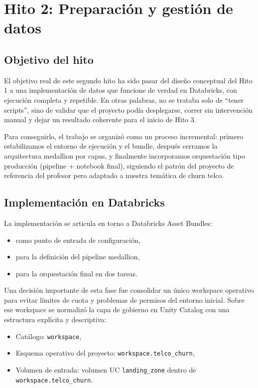 \documentclass[12pt,a4paper]{article}
\begin{document}
\section{Hito 2: Preparación y gestión de datos}

\subsection{Objetivo del hito}

El objetivo real de este segundo hito ha sido pasar del diseño conceptual del Hito 1 a una implementación de datos que funcione de verdad en Databricks, con ejecución completa y repetible. En otras palabras, no se trataba solo de ``tener scripts'', sino de validar que el proyecto podía desplegarse, correr sin intervención manual y dejar un resultado coherente para el inicio de Hito 3.

Para conseguirlo, el trabajo se organizó como un proceso incremental: primero estabilizamos el entorno de ejecución y el bundle, después cerramos la arquitectura medallion por capas, y finalmente incorporamos orquestación tipo producción (pipeline + notebook final), siguiendo el patrón del proyecto de referencia del profesor pero adaptado a nuestra temática de churn telco.

\subsection{Implementación en Databricks}

La implementación se articula en torno a Databricks Asset Bundles:
\begin{itemize}
    \item {} como punto de entrada de configuración,
    \item {} para la definición del pipeline medallion,
    \item {} para la orquestación final en dos tareas.
\end{itemize}

Una decisión importante de esta fase fue consolidar un único workspace operativo para evitar límites de cuota y problemas de permisos del entorno inicial. Sobre ese workspace se normalizó la capa de gobierno en Unity Catalog con una estructura explícita y descriptiva:
\begin{itemize}
    \item Catálogo: \texttt{workspace},
    \item Esquema operativo del proyecto: \texttt{workspace.telco\_churn},
    \item Volumen de entrada: volumen UC \texttt{landing\_zone} dentro de \texttt{workspace.telco\_churn}.
\end{itemize}
\end{document}
